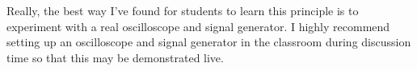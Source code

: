 





Really, the best way I've found for students to learn this principle is to experiment with a real oscilloscope and signal generator.  I highly recommend setting up an oscilloscope and signal generator in the classroom during discussion time so that this may be demonstrated live.





